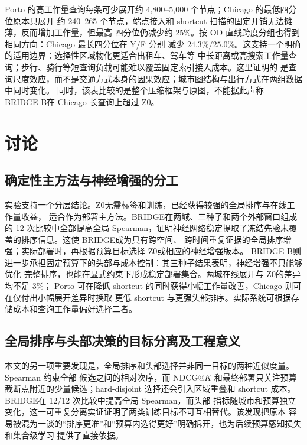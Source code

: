 \documentclass[UTF8,a4paper,10pt,twocolumn]{ctexart}
\newcommand{\zmethod}{Z0}
\newcommand{\gmethod}{BRIDGE}
\newcommand{\bmethod}{BRIDGE-B}
\begin{document}
Porto 的高工作量查询每条可少展开约 4,800--5,000 个节点；Chicago 的最低四分位原本只展开
约 240--265 个节点，端点接入和 shortcut 扫描的固定开销无法摊薄，反而增加工作量，但最高
四分位仍减少约 $25\%$。按 OD 直线跨度分组也得到相同方向：Chicago 最长四分位在 Y/F 分别
减少 $24.3\%/25.0\%$。这支持一个明确的适用边界：选择性区域物化更适合出租车、驾车等
中长距离或高搜索工作量查询；步行、骑行等短查询负载可能难以覆盖固定索引接入成本。这里证明的
是查询尺度效应，而不是交通方式本身的因果效应；城市图结构与出行方式在两组数据中同时变化。
同时，该表比较的是整个压缩框架与原图，不能据此声称 \bmethod 在 Chicago 长查询上超过
\zmethod。

\section{讨论}

\subsection{确定性主方法与神经增强的分工}

实验支持一个分层结论。\zmethod 无需标签和训练，已经获得较强的全局排序与在线工作量收益，
适合作为部署主方法。\gmethod 在两城、三种子和两个外部窗口组成的 12 次比较中全部提高全局
Spearman，证明神经网络稳定提取了冻结先验未覆盖的排序信息。这使 \gmethod 成为具有跨空间、
跨时间重复证据的全局排序增强；实际部署时，再根据预算目标选择 \zmethod 或相应的神经增强版本。
\bmethod 则进一步承担固定预算下的头部与成本控制：其三种子结果表明，神经增强不只能够优化
完整排序，也能在显式约束下形成稳定部署集合。两城在线展开与 \zmethod 的差异均不足 3\%；
Porto 可在降低 shortcut 的同时获得小幅工作量改善，Chicago 则可在仅付出小幅展开差异时换取
更低 shortcut 与更强头部排序。实际系统可根据存储成本和查询工作量偏好选择二者。

\subsection{全局排序与头部决策的目标分离及工程意义}

本文的另一项重要发现是，全局排序和头部选择并非同一目标的两种近似度量。Spearman 约束全部
候选之间的相对次序，而 NDCG@$K$ 和最终部署只关注预算截断点附近的少量候选；hard-disjoint
选择还会引入区域重叠和 shortcut 成本。\gmethod 在 12/12 次比较中提高全局 Spearman，而头部
指标随城市和预算独立变化，这一可重复分离实证证明了两类训练目标不可互相替代。该发现把原本
容易被混为一谈的“排序更准”和“预算内选得更好”明确拆开，也为后续预算感知损失和集合级学习
提供了直接依据。
\end{document}
